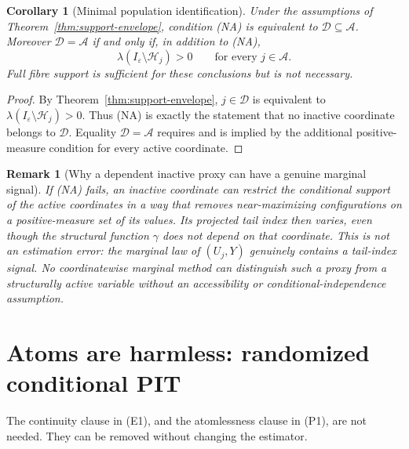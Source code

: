 \documentclass[11pt]{article}
\newtheorem{corollary}[theorem]{Corollary}
\newtheorem{remark}[theorem]{Remark}
\theoremstyle{definition}\newtheorem{definition}[theorem]{Definition}
\newcommand{\I}{I_\varepsilon}
\newcommand{\A}{\mathcal A}
\newcommand{\D}{\mathcal D}
\begin{document}
\begin{corollary}[Minimal population identification]
\label{cor:minimal-identification}
Under the assumptions of Theorem~\ref{thm:support-envelope}, condition (NA)
is equivalent to $\D\subseteq\A$.  Moreover $\D=\A$ if and only if, in
addition to (NA),
\[
 \lambda(\I\setminus\mathcal H_j)>0
 \qquad\text{for every }j\in\A.
\]
Full fibre support is sufficient for these conclusions but is not necessary.
\end{corollary}

\begin{proof}
By Theorem~\ref{thm:support-envelope}, $j\in\D$ is equivalent to
$\lambda(\I\setminus\mathcal H_j)>0$.  Thus (NA) is exactly the statement
that no inactive coordinate belongs to $\D$.  Equality $\D=\A$ requires and
is implied by the additional positive-measure condition for every active
coordinate.
\end{proof}

\begin{remark}[Why a dependent inactive proxy can have a genuine marginal signal]
If (NA) fails, an inactive coordinate can restrict the conditional support of
the active coordinates in a way that removes near-maximizing configurations
on a positive-measure set of its values.  Its projected tail index then varies,
even though the structural function $\gamma$ does not depend on that
coordinate.  This is not an estimation error: the marginal law of $(U_j,Y)$
genuinely contains a tail-index signal.  No coordinatewise marginal method
can distinguish such a proxy from a structurally active variable without an
accessibility or conditional-independence assumption.
\end{remark}

\section{Atoms are harmless: randomized conditional PIT}

The continuity clause in (E1), and the atomlessness clause in (P1), are not
needed.  They can be removed without changing the estimator.
\end{document}
